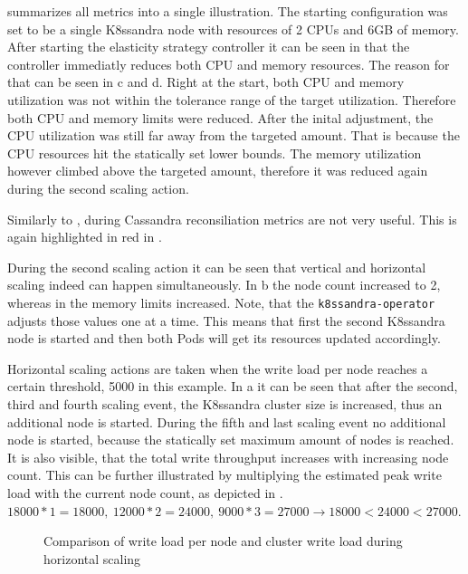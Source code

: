  summarizes all metrics into a single illustration. The starting configuration was set to be a single K8ssandra node with resources of 2 CPUs and 6GB of memory. After starting the elasticity strategy controller it can be seen in  that the controller immediatly reduces both CPU and memory resources. The reason for that can be seen in c and d. Right at the start, both CPU and memory utilization was not within the tolerance range of the target utilization. Therefore both CPU and memory limits were reduced. After the inital adjustment, the CPU utilization was still far away from the targeted amount. That is because the CPU resources hit the statically set lower bounds. The memory utilization however climbed above the targeted amount, therefore it was reduced again during the second scaling action.

Similarly to , during Cassandra reconsiliation metrics are not very useful. This is again highlighted in red in .

During the second scaling action it can be seen that vertical and horizontal scaling indeed can happen simultaneously. In b the node count increased to 2, whereas in  the memory limits increased. Note, that the \texttt{k8ssandra-operator} adjusts those values one at a time. This means that first the second K8ssandra node is started and then both Pods will get its resources updated accordingly.

Horizontal scaling actions are taken when the write load per node reaches a certain threshold, 5000 in this example. In a it can be seen that after the second, third and fourth scaling event, the K8ssandra cluster size is increased, thus an additional node is started. During the fifth and last scaling event no additional node is started, because the statically set maximum amount of nodes is reached. It is also visible, that the total write throughput increases with increasing node count. This can be further illustrated by multiplying the estimated peak write load with the current node count, as depicted in . \(18000 * 1 = 18000,\ 12000 * 2 = 24000,\ 9000 * 3 = 27000 \rightarrow 18000 < 24000 < 27000\).

\begin{figure}
    \centering
    
    \caption{Comparison of write load per node and cluster write load during horizontal scaling}
    \label{fig:diagonal-elasticity_cluster-write-load}
\end{figure}

